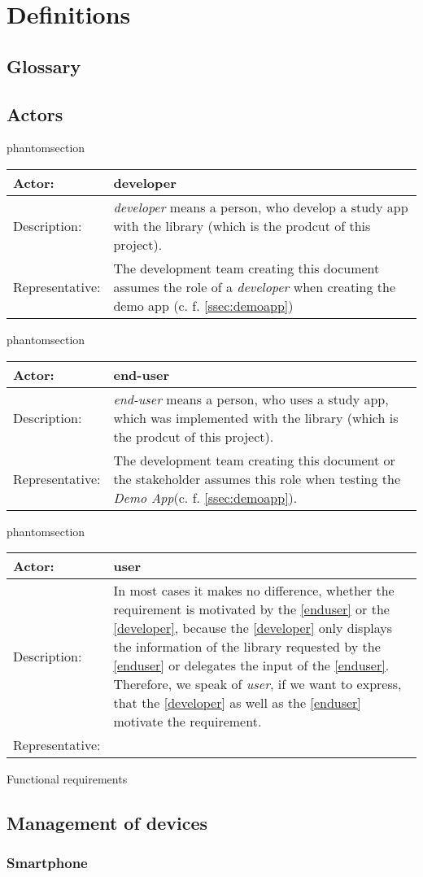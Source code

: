 \documentclass[12pt]{article}
\makeatletter
\newcommand{\labeltext}[2]{%
  \@bsphack
  \csname phantomsection\endcsname %
  \def\@currentlabel{#1}{\label{#2}}%
  \@esphack
}
\newcounter{fr}
\newcommand{\actor}[4]{
\labeltext{#2}{#1}
\begin{tabularx}{16cm}{|l|X|}
\hline 
Actor: & #2 \\
\hline
Description: & #3 \\
\hline
Representative: & #4 \\
\hline
\end{tabularx}
}
\newcommand{\rref}[1]{\ref{#1}}
\makeatother
\begin{document}
\section{Definitions}
\subsection{Glossary}

\subsection{Actors}

\actor{developer}{developer}{\textit{developer} means a person, who develop a study app with the library (which is the prodcut of this project).}{The development team creating this document assumes the role of a \textit{developer} when creating the demo app (c. f. \ref{ssec:demoapp})}

\actor{enduser}{end-user}{\textit{end-user} means a person, who uses a study app, which was implemented with the library (which is the prodcut of this project).}{The development team creating this document or the stakeholder assumes this role when testing the \textit{Demo App}(c. f. \ref{ssec:demoapp}).}

\actor{user}{user}{In most cases it makes no difference, whether the requirement is motivated by the \rref{enduser} or the \rref{developer}, because the \rref{developer} only displays the information of the library requested by the \rref{enduser} or delegates the input of the \rref{enduser}. Therefore, we speak of \textit{user}, if we want to express, that the \rref{developer} as well as the \rref{enduser} motivate the requirement.}

\section{Functional requirements}
\subsection{Management of devices}
\label{ssec:Management of devices}
\subsubsection{Smartphone}
\end{document}
